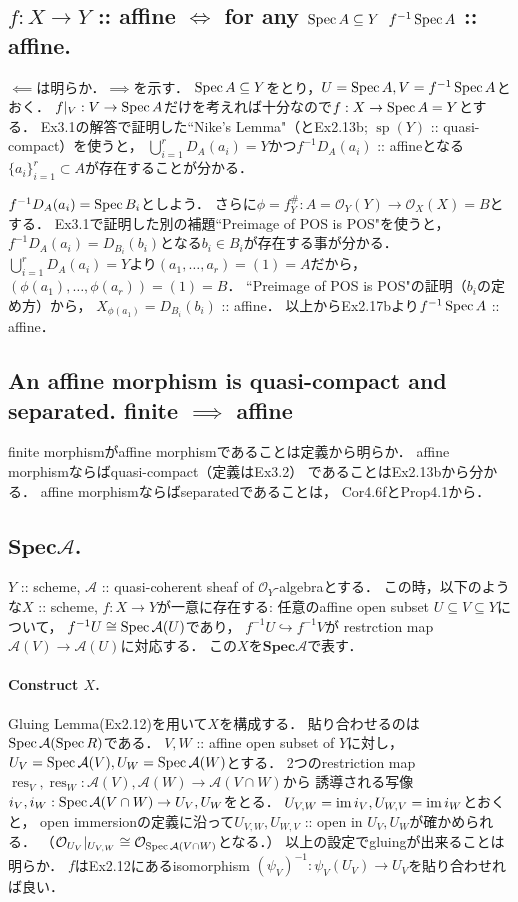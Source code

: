 \documentclass[a4paper]{jsarticle}
\newcommand{\shA}{\mathcal{A}}
\newcommand{\shO}{\mathcal{O}}
\newcommand{\res}{\operatorname{res}}
\newcommand{\basesp}{\operatorname{sp}}
\newcommand{\bfSpec}{\mathbf{Spec}}
\begin{document}
    \subsection{$f: X \to Y$ :: affine $\iff$ for any $\operatorname{Spec} A \subseteq Y$ $f^{-1}\operatorname{Spec} A$ :: affine.}
    $\impliedby$は明らか．$\implies$を示す．
    $\operatorname{Spec} A \subseteq Y$をとり，$U=\operatorname{Spec} A, V=f^{-1} \operatorname{Spec} A$とおく．
    $f|_V: V \to \operatorname{Spec} A$だけを考えれば十分なので$f: X \to \operatorname{Spec} A=Y$とする．
    Ex3.1の解答で証明した``Nike’s Lemma"（とEx2.13b; $\basesp(Y)$ :: quasi-compact）を使うと，
    $\bigcup_{i=1}^r D_A(a_i)=Y$かつ$f^{-1} D_A(a_i)$ :: affineとなる
    $\{a_i\}_{i=1}^r \subset A$が存在することが分かる．

    $f^{-1} D_A(a_i)=\operatorname{Spec} B_i$としよう．
    さらに$\phi=f^{\#}_Y: A=\shO_Y(Y) \to \shO_X(X)=B$とする．
    Ex3.1で証明した別の補題``Preimage of POS is POS"を使うと，
    $f^{-1} D_A(a_i)=D_{B_i}(b_i)$となる$b_i \in B_i$が存在する事が分かる．
    $\bigcup_{i=1}^r D_A(a_i)=Y$より$(a_1,\dots,a_r)=(1)=A$だから，
    $(\phi(a_1), \dots,\phi(a_r))=(1)=B$．
    ``Preimage of POS is POS"の証明（$b_i$の定め方）から，
    $X_{\phi(a_1)}=D_{B_i}(b_i)$ :: affine．
    以上からEx2.17bより$f^{-1}\operatorname{Spec} A$ :: affine．

    \subsection{An affine morphism is quasi-compact and separated. finite $\implies$ affine}
    finite morphismがaffine morphismであることは定義から明らか．
    affine morphismならばquasi-compact（定義はEx3.2）
    であることはEx2.13bから分かる．
    affine morphismならばseparatedであることは，
    Cor4.6fとProp4.1から．
    
    \subsection{$\bfSpec \shA$.}
    $Y$ :: scheme, $\shA$ :: quasi-coherent sheaf of $\shO_Y$-algebraとする．
    この時，以下のような$X$ :: scheme, $f : X \to Y$が一意に存在する:
    任意のaffine open subset $U \subseteq V \subseteq Y$について，
    $f^{-1}U \iso \Spec \shA(U)$であり，
    $f^{-1}U \hookrightarrow f^{-1}V$が
    restrction map $\shA(V) \to \shA(U)$に対応する．
    この$X$を$\bfSpec \shA$で表す．

    \paragraph{Construct $X$.}
    Gluing Lemma(Ex2.12)を用いて$X$を構成する．
    貼り合わせるのは$\Spec \shA(\Spec R)$である．
    $V, W$ :: affine open subset of $Y$に対し，
    $U_{V}=\Spec \shA(V), U_{W}=\Spec \shA(W)$とする．
    2つのrestriction map $\res_V, \res_W: \shA(V), \shA(W) \to \shA(V \cap W)$から
    誘導される写像$i_V, i_W: \Spec \shA(V \cap W) \to U_V, U_W$をとる．
    $U_{V,W}=\operatorname{im} i_V, U_{W,V}=\operatorname{im} i_W$とおくと，
    open immersionの定義に沿って$U_{V,W}, U_{W,V}$ :: open in $U_V, U_W$が確かめられる．
    （$\shO_{U_V}|_{U_{V,W}} \iso \shO_{\Spec \shA(V \cap W)}$となる．）
    以上の設定でgluingが出来ることは明らか．
    $f$はEx2.12にあるisomorphism $(\psi_V)^{-1}: \psi_V(U_V) \to U_V$を貼り合わせれば良い．
\end{document}
